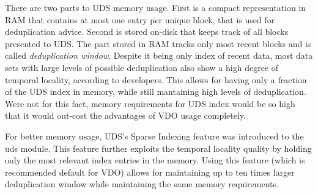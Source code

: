 \documentclass[
  color, %
  table, %
  lof,   %
  lot,   %
]{fithesis3}
\begin{document}
There are two parts to UDS memory usage. First is a compact representation in RAM that contains at most one entry per unique block, that is used for deduplication advice. Second is stored on-disk that keeps track of all blocks presented to UDS. The part stored in RAM tracks only most recent blocks and is called \emph{deduplication window}. Despite it being only index of recent data, most data sets with large levels of possible deduplication also show a high degree of temporal locality, according to developers. This allows for having only a fraction of the UDS index in memory, while still mantaining high levels of deduplication. Were not for this fact, memory requirements for UDS index would be so high that it would out-cost the advantages of VDO usage completely.

For better memory usage, UDS's Sparse Indexing feature was introduced to the uds module. This feature further exploits the temporal locality quality by holding only the most relevant index entries in the memory. Using this feature (which is recommended default for VDO) allows for maintaining up to ten times larger deduplication window while maintaining the same memory requirements.





\end{document}
